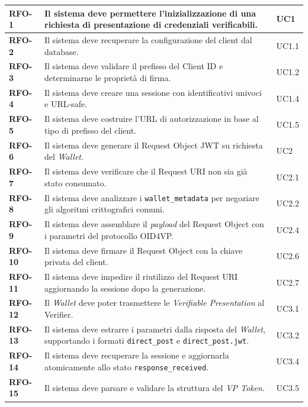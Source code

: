 \begin{longtable}{p{1.8cm} p{8.4cm} p{2.2cm}}
\textbf{RFO-1} & Il sistema deve permettere l'inizializzazione di una richiesta di presentazione di credenziali verificabili. & UC1 \\
\hline
\textbf{RFO-2} & Il sistema deve recuperare la configurazione del client dal database. & UC1.1 \\
\hline
\textbf{RFO-3} & Il sistema deve validare il prefisso del Client ID e determinarne le proprietà di firma. & UC1.2 \\
\hline
\textbf{RFO-4} & Il sistema deve creare una sessione con identificativi univoci e URL-safe. & UC1.4 \\
\hline
\textbf{RFO-5} & Il sistema deve costruire l'URL di autorizzazione in base al tipo di prefisso del client. & UC1.5 \\
\hline
\textbf{RFO-6} & Il sistema deve generare il Request Object JWT\glsadd{jwt}\glsadd{jwtg} su richiesta del \textit{Wallet}. & UC2 \\
\hline
\textbf{RFO-7} & Il sistema deve verificare che il Request URI non sia già stato consumato. & UC2.1 \\
\hline
\textbf{RFO-8} & Il sistema deve analizzare i \texttt{wallet\_\allowbreak{}metadata} per negoziare gli algoritmi crittografici comuni. & UC2.2 \\
\hline
\textbf{RFO-9} & Il sistema deve assemblare il \textit{payload} del Request Object con i parametri del protocollo OID4VP\glsadd{oid4vp}\glsadd{oid4vpg}. & UC2.4 \\
\hline
\textbf{RFO-10} & Il sistema deve firmare il Request Object con la chiave privata del client. & UC2.6 \\
\hline
\textbf{RFO-11} & Il sistema deve impedire il riutilizzo del Request URI aggiornando la sessione dopo la generazione. & UC2.7 \\
\hline
\textbf{RFO-12} & Il \textit{Wallet} deve poter trasmettere le \textit{Verifiable Presentation} al Verifier\glsadd{verifierg}. & UC3.1 \\
\hline
\textbf{RFO-13} & Il sistema deve estrarre i parametri dalla risposta del \textit{Wallet}, supportando i formati \texttt{direct\_\allowbreak{}post} e \texttt{direct\_\allowbreak{}post.jwt}. & UC3.2 \\
\hline
\textbf{RFO-14} & Il sistema deve recuperare la sessione e aggiornarla atomicamente allo stato \texttt{response\_\allowbreak{}received}. & UC3.4 \\
\hline
\textbf{RFO-15} & Il sistema deve parsare e validare la struttura del \textit{VP Token\glsadd{vptokeng}}. & UC3.5 \\

\end{longtable}
